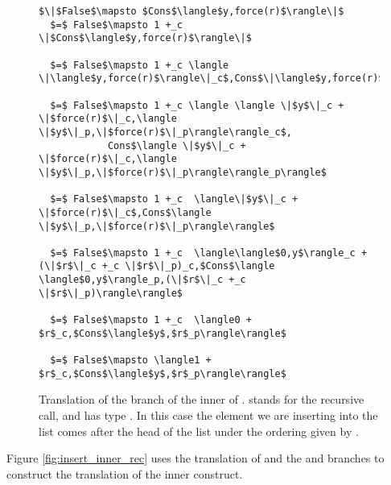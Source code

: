\begin{figure}[H]
\caption{Translation of the  branch of the inner  of .
\label{fig:insert_false}
 stands for the recursive call, and has type .
In this case the element we are inserting into the list comes after the head of the list under the ordering given by .
}
\begin{lstlisting}
$\|$False$\mapsto $Cons$\langle$y,force(r)$\rangle\|$
  $=$ False$\mapsto 1 +_c \|$Cons$\langle$y,force(r)$\rangle\|$

  $=$ False$\mapsto 1 +_c \langle \|\langle$y,force(r)$\rangle\|_c$,Cons$\|\langle$y,force(r)$\rangle\|_p\rangle$

  $=$ False$\mapsto 1 +_c \langle \langle \|$y$\|_c + \|$force(r)$\|_c,\langle \|$y$\|_p,\|$force(r)$\|_p\rangle\rangle_c$,
            Cons$\langle \|$y$\|_c + \|$force(r)$\|_c,\langle \|$y$\|_p,\|$force(r)$\|_p\rangle\rangle_p\rangle$

  $=$ False$\mapsto 1 +_c  \langle\|$y$\|_c + \|$force(r)$\|_c$,Cons$\langle \|$y$\|_p,\|$force(r)$\|_p\rangle\rangle$

  $=$ False$\mapsto 1 +_c  \langle\langle$0,y$\rangle_c + (\|$r$\|_c +_c \|$r$\|_p)_c,$Cons$\langle \langle$0,y$\rangle_p,(\|$r$\|_c +_c \|$r$\|_p)\rangle\rangle$

  $=$ False$\mapsto 1 +_c  \langle0 + $r$_c,$Cons$\langle$y$,$r$_p\rangle\rangle$

  $=$ False$\mapsto \langle1 + $r$_c,$Cons$\langle$y$,$r$_p\rangle\rangle$
\end{lstlisting}
\end{figure}

Figure \ref{fig:insert_inner_rec} uses the translation of  and the  and  branches to construct the translation of the inner  construct.

